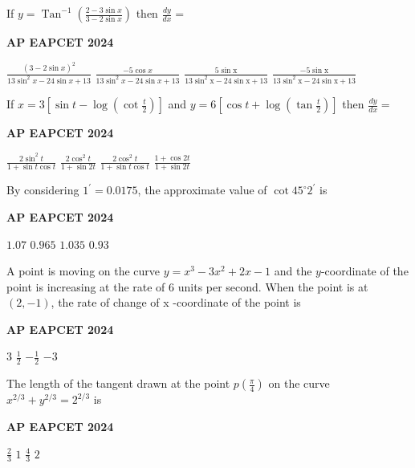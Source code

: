 \documentclass[11pt,paper=a4,answers]{exam}
\begin{document}
\begin{multicols}{2}
\begin{questions}
\question
If $y=\operatorname{Tan}^{-1}\left(\frac{2-3 \sin x}{3-2 \sin x}\right)$ then $\frac{d y}{d x}=$
\begin{flushright}
\small\textbf{AP EAPCET 2024}
\end{flushright}
\begin{choices}
  \choice $\frac{(3-2 \sin x)^2}{13 \sin ^2 x-24 \sin x+13}$
  \choice $\frac{-5 \cos x}{13 \sin ^2 x-24 \sin x+13}$
  \choice $\frac{5 \sin \mathrm{x}}{13 \sin ^2 \mathrm{x}-24 \sin \mathrm{x}+13}$ 
  \choice $\frac{-5 \sin \mathrm{x}}{13 \sin ^2 \mathrm{x}-24 \sin \mathrm{x}+13}$
\end{choices}

\question
If $x=3\left[\sin t-\log \left(\cot \frac{t}{2}\right)\right]$ and $y=6\left[\cos t+\log \left(\tan \frac{t}{2}\right)\right]$ then $\frac{d y}{d x}=$
\begin{flushright}
\small\textbf{AP EAPCET 2024}
\end{flushright}
\begin{choices}
  \choice $\frac{2 \sin ^2 t}{1+\sin t \cos t}$
  \choice $\frac{2 \cos ^2 t}{1+\sin 2 t} $ 
  \choice $\frac{2 \cos ^2 t}{1+\sin t \cos t}$ 
  \choice $\frac{1+\cos 2 t}{1+\sin 2 t}$
\end{choices}





\question
By considering $1^{\prime}=0.0175$, the approximate value of $\cot 45^{\circ} 2^{\prime}$ is
\begin{flushright}
\small\textbf{AP EAPCET 2024}
\end{flushright}
\begin{choices}
  \choice $1.07$
  \choice $0.965$ 
  \choice $1.035$ 
  \choice $0.93$
\end{choices}

\question
A point is moving on the curve $y=x^3-3 x^2+2 x-1$ and the $y$-coordinate of the point is increasing at the rate of 6 units per second. When the point is at $(2,-1)$, the rate of change of x -coordinate of the point is
\begin{flushright}
\small\textbf{AP EAPCET 2024}
\end{flushright}
\begin{choices}
  \choice $3$
  \choice $\frac{1}{2}$
  \choice $-\frac{1}{2}$
  \choice $-3$
\end{choices}

\question
The length of the tangent drawn at the point $p\left(\frac{\pi}{4}\right)$ on the curve $x^{2 / 3}+y^{2 / 3}=2^{2 / 3}$ is
\begin{flushright}
\small\textbf{AP EAPCET 2024}
\end{flushright}
\begin{choices}
  \choice $\frac{2}{3}$
  \choice $1$ 
  \choice $\frac{4}{3}$
  \choice $2$
\end{choices}


\end{questions}
\end{multicols}
\end{document}
